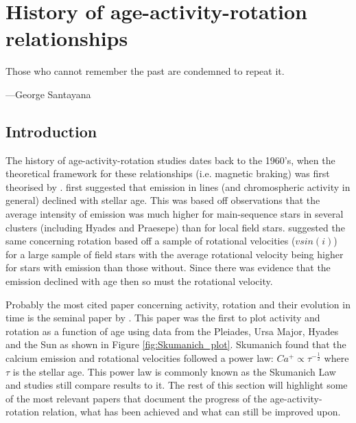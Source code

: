 
\chapter{History of age-activity-rotation relationships} %

\label{Chapter2} %


\epigraph{Those who cannot remember the past are condemned to repeat it.}{---George Santayana}


\section{Introduction}

The history of age-activity-rotation studies dates back to the 1960's, when the theoretical framework for these relationships (i.e. magnetic braking) was first theorised by \citet{Schatzman_1962}. \citet{Wilson_1963} first suggested that emission in \caII lines (and chromospheric activity in general) declined with stellar age. This was based off observations that the average intensity of \caII emission was much higher for main-sequence stars in several clusters (including Hyades and Praesepe) than for local field stars. \citet{Kraft_1967} suggested the same concerning rotation based off a sample of rotational velocities ($vsin(i)$) for a large sample of field stars with the average rotational velocity being higher for stars with \caII emission than those without. Since there was evidence that the \caII emission declined with age then so must the rotational velocity.

Probably the most cited paper concerning activity, rotation and their evolution in time is the seminal paper by \citet{Skumanich_1972}. This paper was the first to plot activity and rotation as a function of age using data from the Pleiades, Ursa Major, Hyades and the Sun as shown in Figure \ref{fig:Skumanich_plot}. Skumanich found that the calcium emission and rotational velocities followed a power law: $Ca^{+} \propto \tau^{-\frac{1}{2}}$ where $\tau$ is the stellar age. This power law is commonly known as the Skumanich Law and studies still compare results to it. The rest of this section will highlight some of the most relevant papers that document the progress of the age-activity-rotation relation, what has been achieved and what can still be improved upon.


